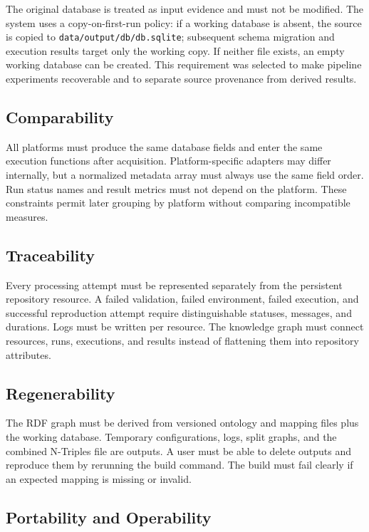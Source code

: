 The original database is treated as input evidence and must not be modified. The system uses a copy-on-first-run policy: if a working database is absent, the source is copied to \texttt{data/output/db/db.sqlite}; subsequent schema migration and execution results target only the working copy. If neither file exists, an empty working database can be created. This requirement was selected to make pipeline experiments recoverable and to separate source provenance from derived results.

\subsection{Comparability}

All platforms must produce the same database fields and enter the same execution functions after acquisition. Platform-specific adapters may differ internally, but a normalized metadata array must always use the same field order. Run status names and result metrics must not depend on the platform. These constraints permit later grouping by platform without comparing incompatible measures.

\subsection{Traceability}

Every processing attempt must be represented separately from the persistent repository resource. A failed validation, failed environment, failed execution, and successful reproduction attempt require distinguishable statuses, messages, and durations. Logs must be written per resource. The knowledge graph must connect resources, runs, executions, and results instead of flattening them into repository attributes.

\subsection{Regenerability}

The RDF graph must be derived from versioned ontology and mapping files plus the working database. Temporary configurations, logs, split graphs, and the combined N-Triples file are outputs. A user must be able to delete outputs and reproduce them by rerunning the build command. The build must fail clearly if an expected mapping is missing or invalid.

\subsection{Portability and Operability}

